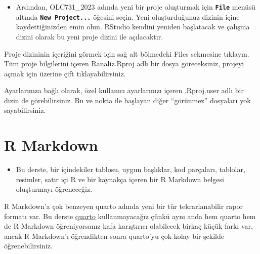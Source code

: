 \documentclass[
  oneside]{book}
\providecommand{\tightlist}{%
  \setlength{\itemsep}{0pt}\setlength{\parskip}{0pt}}
\begin{document}
\begin{itemize}
\tightlist
\item
  Ardından, OLC731\_2023 adında yeni bir proje oluşturmak için \textbf{\texttt{File}} menüsü altında \textbf{\texttt{New\ Project...}} öğesini seçin. Yeni oluşturduğunuz dizinin içine kaydettiğinizden emin olun. RStudio kendini yeniden başlatacak ve çalışma dizini olarak bu yeni proje dizini ile açılacaktır.
\end{itemize}

Proje dizininin içeriğini görmek için sağ alt bölmedeki Files sekmesine tıklayın. Tüm proje bilgilerini içeren Ranaliz.Rproj adlı bir dosya göreceksiniz, projeyi açmak için üzerine çift tıklayabilirsiniz.

\begin{info}
Ayarlarınıza bağlı olarak, özel kullanıcı ayarlarınızı içeren .Rproj.user adlı bir dizin de görebilirsiniz. Bu ve nokta ile başlayan diğer ``görünmez'' dosyaları yok sayabilirsiniz.

\end{info}

\hypertarget{r-markdown}{%
\section{R Markdown}\label{r-markdown}}

\begin{itemize}
\tightlist
\item
  Bu derste, bir içindekiler tablosu, uygun başlıklar, kod parçaları, tablolar, resimler, satır içi R ve bir kaynakça içeren bir R Markdown belgesi oluşturmayı öğreneceğiz.
\end{itemize}

\begin{info}
R Markdown'a çok benzeyen quarto adında yeni bir tür tekrarlanabilir rapor formatı var. Bu derste \href{https://quarto.org/}{quarto} kullanmayacağız çünkü aynı anda hem quarto hem de R Markdown öğreniyorsanız kafa karıştırıcı olabilecek birkaç küçük farkı var, ancak R Markdown'ı öğrendikten sonra quarto'yu çok kolay bir şekilde öğrenebilirsiniz.

\end{info}
\end{document}
